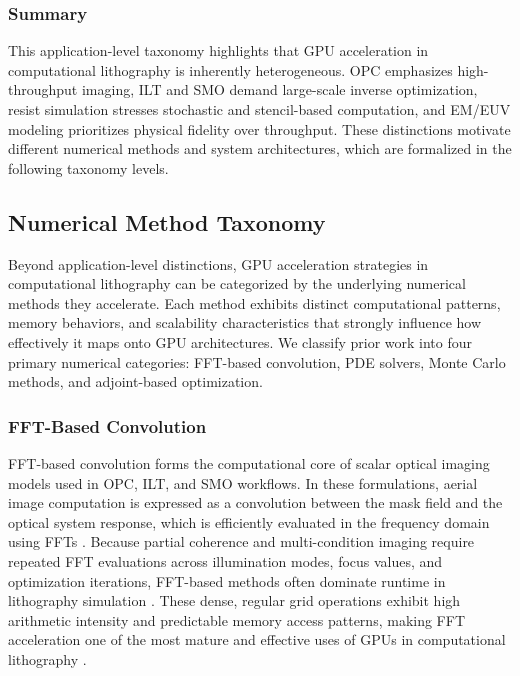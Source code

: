 \documentclass[pdflatex,sn-mathphys-num]{sn-jnl}%
\theoremstyle{thmstyleone}%
\theoremstyle{thmstyletwo}%
\theoremstyle{thmstylethree}%
\begin{document}
\subsubsection{Summary}
This application-level taxonomy highlights that GPU acceleration in computational lithography is inherently heterogeneous. OPC emphasizes high-throughput imaging, ILT and SMO demand large-scale inverse optimization, resist simulation stresses stochastic and stencil-based computation, and EM/EUV modeling prioritizes physical fidelity over throughput. These distinctions motivate different numerical methods and system architectures, which are formalized in the following taxonomy levels.


\subsection{Numerical Method Taxonomy}
Beyond application-level distinctions, GPU acceleration strategies in computational lithography can be categorized by the underlying numerical methods they accelerate. Each method exhibits distinct computational patterns, memory behaviors, and scalability characteristics that strongly influence how effectively it maps onto GPU architectures. We classify prior work into four primary numerical categories: FFT-based convolution, PDE solvers, Monte Carlo methods, and adjoint-based optimization.
\subsubsection{FFT-Based Convolution}
FFT-based convolution forms the computational core of scalar optical imaging models used in OPC, ILT, and SMO workflows. In these formulations, aerial image computation is expressed as a convolution between the mask field and the optical system response, which is efficiently evaluated in the frequency domain using FFTs \cite{Hopkins88,Mack2007FundamentalPO}. Because partial coherence and multi-condition imaging require repeated FFT evaluations across illumination modes, focus values, and optimization iterations, FFT-based methods often dominate runtime in lithography simulation \cite{Wong2001ResolutionET}. These dense, regular grid operations exhibit high arithmetic intensity and predictable memory access patterns, making FFT acceleration one of the most mature and effective uses of GPUs in computational lithography \cite{Zheng2023}.
\end{document}
